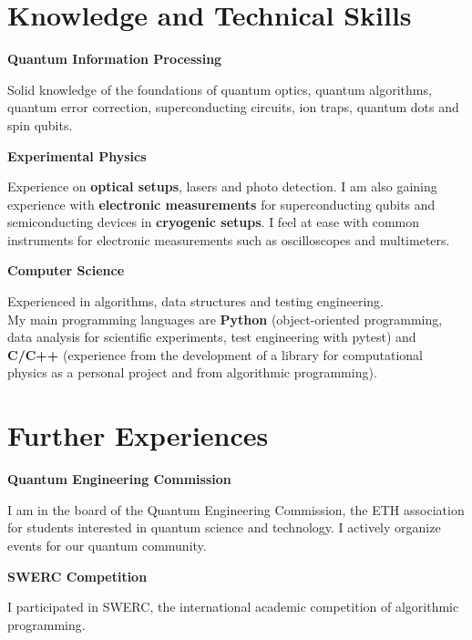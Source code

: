 \documentclass[a4paper,10pt]{article}
\begin{document}
\begin{adjustbox}{valign=t}
\begin{minipage}{0.6\textwidth}
\section*{Knowledge and Technical Skills}
\begin{description}
\setlength\itemsep{-2em}

\item \textbf{Quantum Information Processing}
\begin{spacing}{1.1}
	\small Solid knowledge of the foundations of quantum optics, quantum algorithms, quantum error correction, superconducting circuits, ion traps, quantum dots and spin qubits.
\end{spacing}
\item \textbf{Experimental Physics}
\begin{spacing}{1.1}
	\small Experience on \textbf{optical setups}, lasers and photo detection. I am also gaining experience with \textbf{electronic measurements} for superconducting qubits and semiconducting devices in \textbf{cryogenic setups}. I feel at ease with common instruments for electronic measurements such as oscilloscopes and multimeters.
\end{spacing}
\item \textbf{Computer Science}
\begin{spacing}{1.1}
	\small
	Experienced in algorithms, data structures and testing engineering.\\
	My main programming languages are \textbf{Python} (object-oriented programming, data analysis for scientific experiments, test engineering with pytest) and \textbf{C/C++} (experience from the development of a library for computational physics as a personal project and from algorithmic programming).
\end{spacing}
\end{description}
\vspace{-1cm}
\section*{Further Experiences}
\begin{description}
\raggedright
\setlength\itemsep{-1em}
\item[\normalfont \textcolor{ColorTwo}{}] 
	\textbf{Quantum Engineering Commission}\\
	\begin{spacing}{1.1}
		\small
		I am in the board of the Quantum Engineering Commission, the ETH association for students interested in quantum science and technology. I actively organize events for our quantum community.
	\end{spacing}
\item[\normalfont \textcolor{ColorTwo}{March 2021}] 
	\textbf{SWERC Competition}\\
	\begin{spacing}{1.1}
		\small
		I participated in SWERC, the international academic competition of algorithmic programming.
	\end{spacing}
\end{description}


\end{minipage}
\end{adjustbox}
\end{document}
